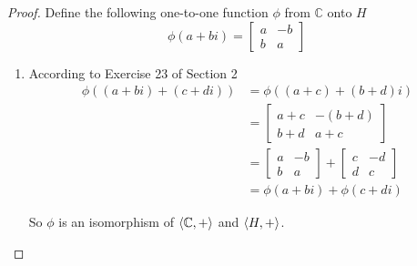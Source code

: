 \begin{proof}
    Define the following one-to-one function $\phi$ from $\mathbb{C}$ onto $H$
    \[
        \phi(a + bi) = \begin{bmatrix}
            a & -b \\
            b & a
        \end{bmatrix}
    \]

    \begin{enumerate}[label={\textbf{\alph*.}},topsep=0pt,itemsep=0pt]
        \item According to Exercise 23 of Section 2
              \begin{align*}
                  \phi((a + bi) + (c + di)) & = \phi((a + c) + (b + d)i)    \\
                                            & = \begin{bmatrix}
                                                    a + c & -(b + d) \\
                                                    b + d & a + c
                                                \end{bmatrix}            \\
                                            & = \begin{bmatrix}
                                                    a & -b \\
                                                    b & a
                                                \end{bmatrix} +
                  \begin{bmatrix}
                      c & -d \\
                      d & c
                  \end{bmatrix}                                            \\
                                            & = \phi(a + bi) + \phi(c + di)
              \end{align*}

              So $\phi$ is an isomorphism of $\left\langle{\mathbb{C},+}\right\rangle$ and $\left\langle{H,+}\right\rangle$.


\end{enumerate}
\end{proof}
